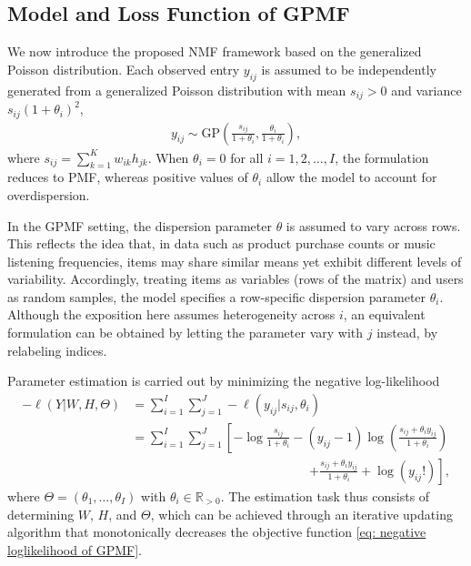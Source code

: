 \documentclass[pdflatex,sn-basic]{sn-jnl}%
\theoremstyle{thmstyleone}%
\theoremstyle{thmstyletwo}%
\theoremstyle{thmstylethree}%
\begin{document}
\subsection{Model and Loss Function of GPMF}
We now introduce the proposed NMF framework based on the generalized Poisson distribution. 
Each observed entry $y_{ij}$ is assumed to be independently generated from a generalized Poisson distribution with mean $s_{ij}>0$ and variance $s_{ij}(1+\theta_{i})^{2}$,
\begin{align*}
	y_{ij}\sim\mathrm{GP}\left(\frac{s_{ij}}{1+\theta_{i}},\frac{\theta_{i}}{1+\theta_{i}}\right),
\end{align*}
where $s_{ij}=\sum_{k=1}^{K}w_{ik}h_{jk}$.
When $\theta_{i}=0$ for all $i=1,2,\dots,I$, the formulation reduces to PMF, whereas positive values of $\theta_{i}$ allow the model to account for overdispersion. 

In the GPMF setting, the dispersion parameter $\theta$ is assumed to vary across rows. 
This reflects the idea that, in data such as product purchase counts or music listening frequencies, items may share similar means yet exhibit different levels of variability. 
Accordingly, treating items as variables (rows of the matrix) and users as random samples, the model specifies a row-specific dispersion parameter $\theta_{i}$. 
Although the exposition here assumes heterogeneity across $i$, an equivalent formulation can be obtained by letting the parameter vary with $j$ instead, by relabeling indices.

Parameter estimation is carried out by minimizing the negative log-likelihood
\begin{align}
	-\ell(Y|W,H,\Theta) &= \sum_{i=1}^{I}\sum_{j=1}^{J}-\ell(y_{ij}|s_{ij},\theta_{i}) \nonumber \\[6pt]
	& = \sum_{i=1}^{I}\sum_{j=1}^{J}\left[-\log\frac{s_{ij}}{1+\theta_{i}} -(y_{ij}-1)\log\left(\frac{s_{ij}+\theta_{i} y_{ij}}{1+\theta_{i}}\right)\right. \nonumber \\[-4pt]
	&\qquad\qquad\qquad\qquad\qquad\qquad\qquad\left. + \frac{s_{ij} + \theta_{i} y_{ij}}{1+\theta_{i}}+\log(y_{ij}!) \right], \label{eq: negative loglikelihood of GPMF}
\end{align}
where $\Theta=(\theta_{1},\ldots,\theta_{I})$ with $\theta_{i}\in\mathbb{R}_{>0}$. 
The estimation task thus consists of determining $W$, $H$, and $\Theta$, which can be achieved through an iterative updating algorithm that monotonically decreases the objective function \eqref{eq: negative loglikelihood of GPMF}.
\end{document}
